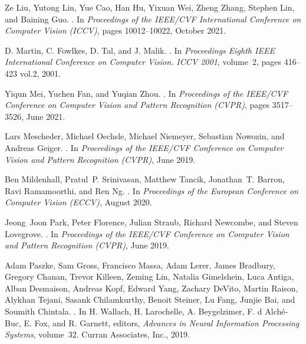 \documentclass[10pt,twocolumn,letterpaper]{article}
\begin{document}
{\begin{thebibliography}{10}
Ze Liu, Yutong Lin, Yue Cao, Han Hu, Yixuan Wei, Zheng Zhang, Stephen Lin, and
  Baining Guo.
.
\newblock In {\em Proceedings of the IEEE/CVF International Conference on
  Computer Vision (ICCV)}, pages 10012--10022, October 2021.

D. Martin, C. Fowlkes, D. Tal, and J. Malik.
.
\newblock In {\em Proceedings Eighth IEEE International Conference on Computer
  Vision. ICCV 2001}, volume~2, pages 416--423 vol.2, 2001.

Yiqun Mei, Yuchen Fan, and Yuqian Zhou.
.
\newblock In {\em Proceedings of the IEEE/CVF Conference on Computer Vision and
  Pattern Recognition (CVPR)}, pages 3517--3526, June 2021.

Lars Mescheder, Michael Oechsle, Michael Niemeyer, Sebastian Nowozin, and
  Andreas Geiger.
.
\newblock In {\em Proceedings of the IEEE/CVF Conference on Computer Vision and
  Pattern Recognition (CVPR)}, June 2019.

Ben Mildenhall, Pratul~P. Srinivasan, Matthew Tancik, Jonathan~T. Barron, Ravi
  Ramamoorthi, and Ren Ng.
.
\newblock In {\em Proceedings of the European Conference on Computer Vision
  (ECCV)}, August 2020.

Jeong~Joon Park, Peter Florence, Julian Straub, Richard Newcombe, and Steven
  Lovegrove.
.
\newblock In {\em Proceedings of the IEEE/CVF Conference on Computer Vision and
  Pattern Recognition (CVPR)}, June 2019.

Adam Paszke, Sam Gross, Francisco Massa, Adam Lerer, James Bradbury, Gregory
  Chanan, Trevor Killeen, Zeming Lin, Natalia Gimelshein, Luca Antiga, Alban
  Desmaison, Andreas Kopf, Edward Yang, Zachary DeVito, Martin Raison, Alykhan
  Tejani, Sasank Chilamkurthy, Benoit Steiner, Lu Fang, Junjie Bai, and Soumith
  Chintala.
.
\newblock In H. Wallach, H. Larochelle, A. Beygelzimer, F. d\textquotesingle
  Alch\'{e}-Buc, E. Fox, and R. Garnett, editors, {\em Advances in Neural
  Information Processing Systems}, volume~32. Curran Associates, Inc., 2019.


\end{thebibliography}}
\end{document}
